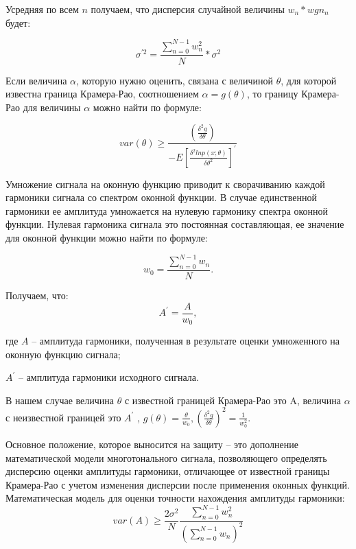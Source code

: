Усредняя по всем $n$ получаем, что дисперсия случайной величины $w_n*wgn_n$ будет: 

\begin{equation}
	\label{eq:equation14}
	\sigma^{'2}=\frac{\sum_{n=0}^{N-1} w_n^2}{N}*\sigma^2
\end{equation}

Если величина $\alpha$, которую нужно оценить, связана с величиной $\theta$, для которой известна граница Крамера-Рао, соотношением $\alpha=g(\theta)$, то границу Крамера-Рао для величины $\alpha$ можно найти по формуле: 

\begin{equation}
	\label{eq:equation15}
	var(\theta)\geq \frac{\left(\frac{\delta^2 g}{\delta\theta}\right)}{-E\left[\frac{\delta^2 ln p(x;\theta)}{\delta \theta^2}\right]^{'}}
\end{equation}

Умножение сигнала на оконную функцию приводит к сворачиванию каждой гармоники сигнала со спектром оконной функции. В случае единственной гармоники ее амплитуда умножается на нулевую гармонику спектра оконной функции. Нулевая гармоника сигнала это постоянная составляющая, ее значение для оконной функции можно найти по формуле: 

\begin{equation}
	\label{eq:equation16}
	w_0= \frac{\sum_{n=0}^{N-1} w_n}{N}.	  
\end{equation}

Получаем, что: 
\begin{equation}
	\label{eq:equation17}
	A^{'}=\frac{A}{w_0} ,		  
\end{equation}

где $A$ -- амплитуда гармоники, полученная в результате оценки умноженного на оконную функцию сигнала; 

$A^{'}$ -- амплитуда гармоники исходного сигнала.

В нашем случае величина $\theta$ с известной границей Крамера-Рао это A, величина $\alpha$ с неизвестной границей это  $A^{'}$ , $g(\theta)=\frac{\theta}{w_0}, \left(\frac{\delta^2 g}{\delta \theta}\right)^2=\frac{1}{w_0^2}$.

Основное положение, которое выносится на защиту -- это дополнение математической модели многотонального сигнала, позволяющего определять дисперсию оценки амплитуды гармоники, отличающее от известной границы Крамера-Рао с учетом изменения дисперсии после применения оконных функций. Математическая модель для оценки точности нахождения амплитуды гармоники:
\begin{equation}
	\label{eq:equation18}
	var(A)\geq \frac{2\sigma^2}{N} \frac{\sum_{n=0}^{N-1}w_n^2}{\left(\sum_{n=0}^{N-1} w_n \right)^2} 			  
\end{equation}

